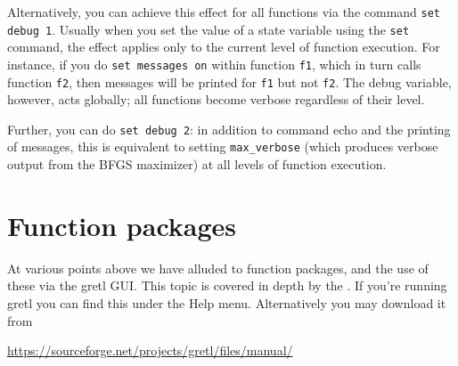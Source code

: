 Alternatively, you can achieve this effect for all functions via
the command \texttt{set debug 1}.  Usually when you set the value of a
state variable using the \texttt{set} command, the effect applies only
to the current level of function execution.  For instance, if you do
\texttt{set messages on} within function \texttt{f1}, which in turn
calls function \texttt{f2}, then messages will be printed for
\texttt{f1} but not \texttt{f2}.  The debug variable, however, acts
globally; all functions become verbose regardless of their level.

Further, you can do \texttt{set debug 2}: in addition to command echo
and the printing of messages, this is equivalent to setting
\verb|max_verbose| (which produces verbose output from the BFGS
maximizer) at all levels of function execution.

\section{Function packages}
\label{sec:func-packages}

At various points above we have alluded to function packages, and the
use of these via the gretl GUI. This topic is covered in depth by the
\PKGBOOK. If you're running gretl you can find this under the
\textsf{Help} menu. Alternatively you may download it from

\url{https://sourceforge.net/projects/gretl/files/manual/}

